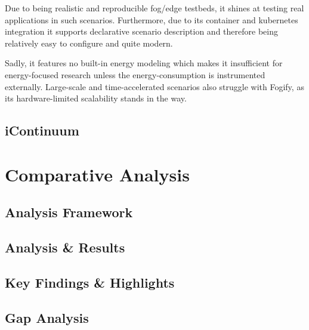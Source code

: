 Due to being realistic and reproducible fog/edge testbeds, it shines at testing real applications in such scenarios.
Furthermore, due to its container and kubernetes integration it supports declarative scenario description and therefore being relatively easy to configure and quite modern.

Sadly, it features no built-in energy modeling which makes it insufficient for energy-focused research unless the energy-consumption is instrumented externally.
Large-scale and time-accelerated scenarios also struggle with Fogify, as its hardware-limited scalability stands in the way.

\subsection{iContinuum}

\section{Comparative Analysis}
\subsection{Analysis Framework}
\subsection{Analysis \& Results}
\subsection{Key Findings \& Highlights}
\subsection{Gap Analysis}
